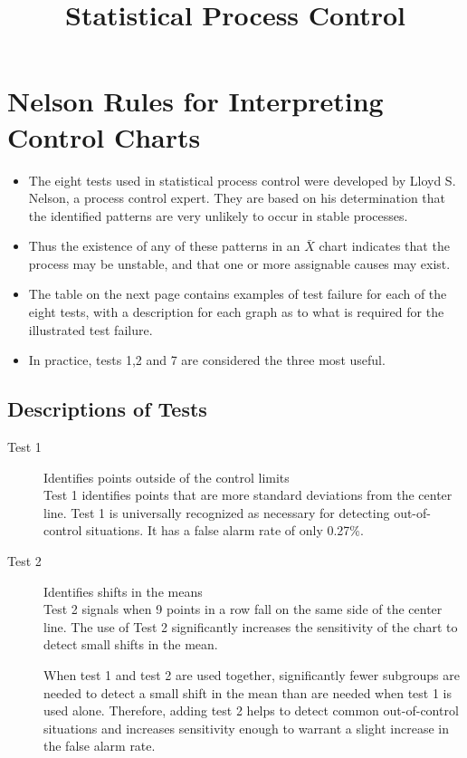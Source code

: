 \documentclass[12pt]{article}
\title{Statistical Process Control}
\begin{document}
\maketitle
\section*{Nelson Rules for Interpreting Control Charts}
\begin{itemize}
\item The eight tests used in statistical process control were developed by Lloyd S. Nelson, a process control expert. They are
based on his determination that the identified patterns are very unlikely to occur in stable processes.

\item Thus
the existence of any of these patterns in an $\bar{X}$ chart indicates that the process may be unstable, and that one or
more assignable causes may exist. 

\item The table on the next page contains examples of test failure for each of the eight tests,
with a description for each graph as to what is required for the illustrated test failure.

\item In practice, tests 1,2 and 7 are considered the three most useful.
\end{itemize}
\subsection*{Descriptions of Tests}
\begin{description}
\item[Test 1] Identifies points outside of the control limits\\
Test 1 identifies points that are more standard deviations from the center line. Test 1 is
universally recognized as necessary for detecting out-of-control situations. It has a
false alarm rate of only 0.27\%.

\item[Test 2] Identifies shifts in the means \\
Test 2 signals when 9 points in a row fall on the same side of the center line.  The use of Test 2
significantly increases the sensitivity of the chart to detect small shifts in the mean.

When test 1 and test 2 are used together, significantly fewer subgroups are needed
to detect a small shift in the mean than are needed when test 1 is used alone.
Therefore, adding test 2 helps to detect common out-of-control situations and
increases sensitivity enough to warrant a slight increase in the false alarm rate.
\end{description}
\end{document}
